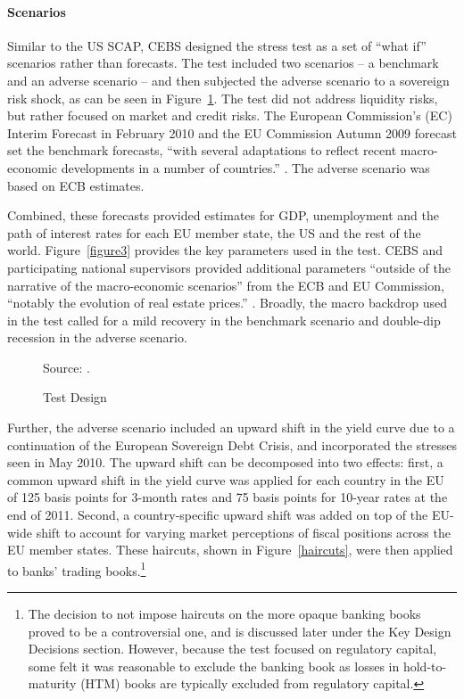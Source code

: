 \documentclass[12pt]{article}
\begin{document}
\paragraph{Scenarios}

Similar to the US SCAP, CEBS designed the stress test as a set of ``what if'' scenarios rather than forecasts. The test included two scenarios -- a benchmark and an adverse scenario -- and then subjected the adverse scenario to a sovereign risk shock, as can be seen in Figure~\ref{design}. The test did not address liquidity risks, but rather focused on market and credit risks. The European Commission's (EC) Interim Forecast in February 2010 and the EU Commission Autumn 2009 forecast set the benchmark forecasts, ``with several adaptations to reflect recent macro-economic developments in a number of countries.'' \citep{Methodology}. The adverse scenario was based on ECB estimates.

Combined, these forecasts provided estimates for GDP, unemployment and the path of interest rates for each EU member state, the US and the rest of the world. Figure~\ref{figure3} provides the key parameters used in the test. CEBS and participating national supervisors provided additional parameters ``outside of the narrative of the macro-economic scenarios'' from the ECB and EU Commission, ``notably the evolution of real estate prices.'' \citep{Methodology}. Broadly, the macro backdrop used in the test called for a mild recovery in the benchmark scenario and double-dip recession in the adverse scenario.


\begin{figure}[h]
\caption{Test Design}\label{design}
\noindent
{}%

\footnotesize Source: \citet{Deutsche}.
\end{figure}

Further, the adverse scenario included an upward shift in the yield curve due to a continuation of the European Sovereign Debt Crisis, and incorporated the stresses seen in May 2010. The upward shift can be decomposed into two effects: first, a common upward shift in the yield curve was applied for each country in the EU of 125 basis points for 3-month rates and 75 basis points for 10-year rates at the end of 2011. Second, a country-specific upward shift was added on top of the EU-wide shift to account for varying market perceptions of fiscal positions across the EU member states. These haircuts, shown in Figure~\ref{haircuts}, were then applied to banks' trading books.\footnote{The decision to not impose haircuts on the more opaque banking books proved to be a controversial one, and is discussed later under the Key Design Decisions section. However, because the test focused on regulatory capital, some felt it was reasonable to exclude the banking book as losses in hold-to-maturity (HTM) books are typically excluded from regulatory capital.}
\end{document}
